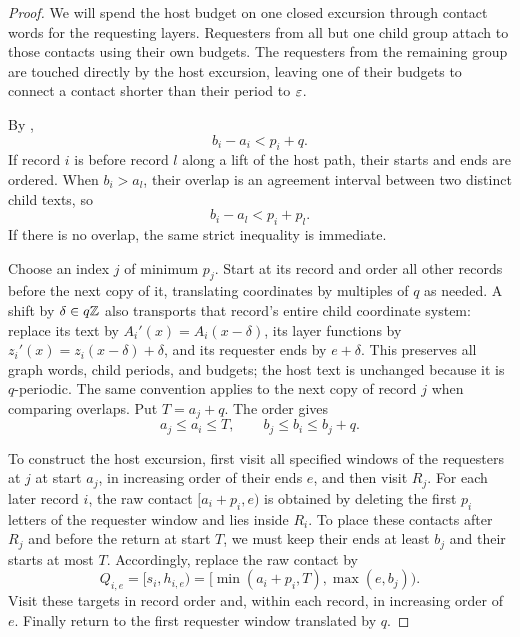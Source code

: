 \begin{proof}
We will spend the host budget on one closed excursion through contact words for the requesting layers. Requesters from all but one child group attach to those contacts using their own budgets. The requesters from the remaining group are touched directly by the host excursion, leaving one of their budgets to connect a contact shorter than their period to $\varepsilon$.

By ,
\begin{equation}\label{eq:host-length}
b_i-a_i<p_i+q.
\end{equation}
If record $i$ is before record $l$ along a lift of the host path, their starts and ends are ordered. When $b_i>a_l$, their overlap is an agreement interval between two distinct child texts, so
\begin{equation}\label{eq:child-overlap}
b_i-a_l<p_i+p_l.
\end{equation}
If there is no overlap, the same strict inequality is immediate.

Choose an index $j$ of minimum $p_j$. Start at its record and order all other records before the next copy of it, translating coordinates by multiples of $q$ as needed. A shift by $\delta\in q\mathbb Z$ also transports that record's entire child coordinate system: replace its text by $A_i'(x)=A_i(x-\delta)$, its layer functions by $z_i'(x)=z_i(x-\delta)+\delta$, and its requester ends by $e+\delta$. This preserves all graph words, child periods, and budgets; the host text is unchanged because it is $q$-periodic. The same convention applies to the next copy of record $j$ when comparing overlaps. Put $T=a_j+q$. The order gives
\begin{equation}\label{eq:host-order}
a_j\le a_i\le T,\qquad b_j\le b_i\le b_j+q.
\end{equation}

To construct the host excursion, first visit all specified windows of the requesters at $j$ at start $a_j$, in increasing order of their ends $e$, and then visit $R_j$. For each later record $i$, the raw contact $[a_i+p_i,e)$ is obtained by deleting the first $p_i$ letters of the requester window and lies inside $R_i$. To place these contacts after $R_j$ and before the return at start $T$, we must keep their ends at least $b_j$ and their starts at most $T$. Accordingly, replace the raw contact by
\begin{equation}\label{eq:host-target}
Q_{i,e}=[s_i,h_{i,e})
=[\min(a_i+p_i,T),\max(e,b_j)).
\end{equation}
Visit these targets in record order and, within each record, in increasing order of $e$. Finally return to the first requester window translated by $q$.


\end{proof}

